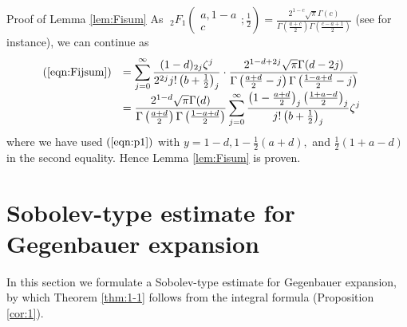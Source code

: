 \documentclass[12pt]{article}
\numberwithin{equation}{section}
\newenvironment{proof*}[1]{\noindent\textbf{#1\ }}{\hspace*{\fill}$\Box$\medskip}
\begin{document}
\begin{proof*}{Proof of Lemma \ref{lem:Fisum}}
  As $\;_2 F_1 \left( \begin{array}{c}
    a, 1 - a\\
    c
  \end{array} ; \displaystyle\frac{1}{2} \right) =\displaystyle \frac{2^{1 - c} \sqrt{\pi} \Gamma
  (c)}{\Gamma \left( \frac{a + c}{2} \right) \Gamma \left( \frac{c - a + 1}{2}
  \right)}$ (see {\cite[Thm. 5.4]{andrews2000special}} for instance), we can
  continue as
  \begin{eqnarray}
    & \begin{array}{ll}
      (\ref{eqn:Fijsum}) & = \displaystyle\sum_{j = 0}^{\infty} \frac{(1 - d)_{2 j}
      \zeta^j}{2^{2 j} j! \left( b + \frac{1}{2} \right)_j} \cdot \frac{2^{1 -
      d + 2 j} \sqrt{\pi} \Gamma (d - 2 j)}{\Gamma \left( \frac{a + d}{2} - j
      \right) \Gamma \left( \frac{1 - a + d}{2} - j \right)}\\
      &\displaystyle = \frac{2^{1 - d} \sqrt{\pi} \Gamma (d)}{\Gamma \left( \frac{a +
      d}{2} \right) \Gamma \left( \frac{1 - a + d}{2} \right)} \displaystyle\sum_{j =
      0}^{\infty} \frac{\left( 1 - \frac{a + d}{2} \right)_j \left( \frac{1 +
      a - d}{2} \right)_j}{j! \left( b + \frac{1}{2} \right)_j} \zeta^j
    \end{array} &  \nonumber
  \end{eqnarray}
  where we have used $(\ref{eqn:p1})$ with $y = 1 - d, 1 - \frac{1}{2} (a +
  d),$ and $\frac{1}{2} (1 + a - d)$ in the second equality. Hence Lemma
  \ref{lem:Fisum} is proven.
\end{proof*}

\section{Sobolev-type estimate for Gegenbauer expansion}\label{sec:Sobolev}
In this section we formulate a Sobolev-type estimate for Gegenbauer expansion, by which
Theorem \ref{thm:1-1} follows from the integral formula (Proposition \ref{cor:1}).
\end{document}

